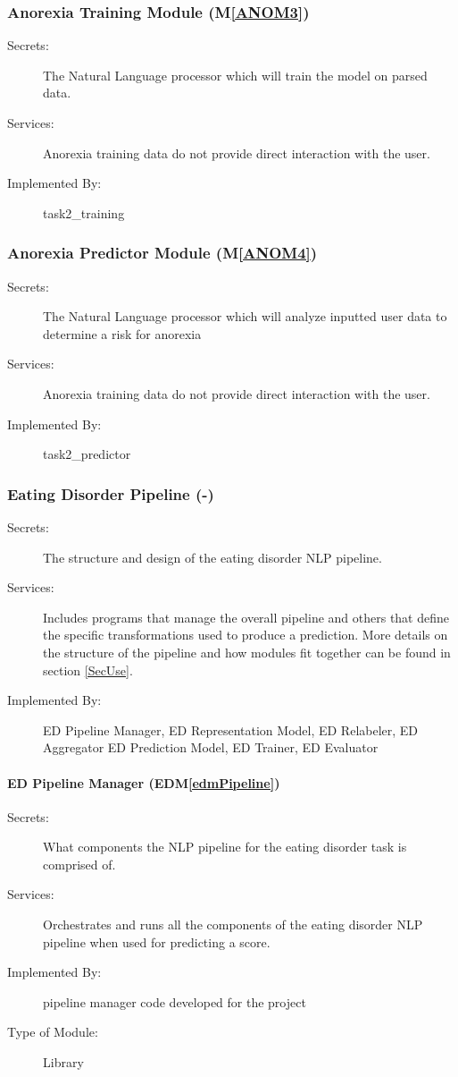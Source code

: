 \documentclass[12pt, titlepage]{article}
\newcommand{\mref}[1]{M\ref{#1}}
\newcommand{\edmref}[1]{EDM\ref{#1}}
\begin{document}
\subsubsection{Anorexia Training Module (\mref{ANOM3})}
\begin{description}
\item[Secrets:] The Natural Language processor which will train the model on parsed data.
\item[Services:] Anorexia training data
  do not provide direct interaction with the user. 
\item[Implemented By:] task2\_training
\end{description}

\subsubsection{Anorexia Predictor Module (\mref{ANOM4})}
\begin{description}
\item[Secrets:] The Natural Language processor which will analyze inputted user data to determine a risk for anorexia
\item[Services:] Anorexia training data
  do not provide direct interaction with the user. 
\item[Implemented By:] task2\_predictor
\end{description}

\subsubsection{Eating Disorder Pipeline (-)}
\begin{description}
\item[Secrets:] The structure and design of the eating disorder NLP pipeline.
\item[Services:] Includes programs that manage the overall pipeline and others that define the specific transformations used to produce a prediction. More details on the structure of the pipeline and how modules fit together can be found in section \ref{SecUse}.
\item[Implemented By:] ED Pipeline Manager, ED Representation Model, ED Relabeler, ED Aggregator ED Prediction Model, ED Trainer, ED Evaluator
\end{description}

\paragraph{ED Pipeline Manager (\edmref{edmPipeline})}
\begin{description}
\item[Secrets:] What components the NLP pipeline for the eating disorder task is comprised of.
\item[Services:] Orchestrates and runs all the components of the eating disorder NLP pipeline when used for predicting a score.
\item[Implemented By:] pipeline manager code developed for the project
\item[Type of Module:] Library
\end{description}
\end{document}
